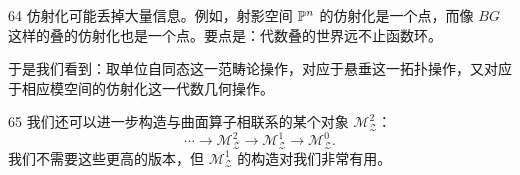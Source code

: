 \begin{srcrem}{64}
仿射化可能丢掉大量信息。例如，射影空间 $\mathbb{P}^{n}$ 的仿射化是一个点，而像 $BG$ 这样的叠的仿射化也是一个点。要点是：代数叠的世界远不止函数环。
\end{srcrem}

于是我们看到：取单位自同态这一范畴论操作，对应于悬垂这一拓扑操作，又对应于相应模空间的仿射化这一代数几何操作。

\begin{srcrem}{65}
我们还可以进一步构造与曲面算子相联系的某个对象 $\mathcal{M}_{\mathcal{Z}}^{2}$：
\begin{equation}\tag{10.195}
\cdots\longrightarrow\mathcal{M}_{\mathcal{Z}}^{2}\longrightarrow\mathcal{M}_{\mathcal{Z}}^{1}\longrightarrow\mathcal{M}_{\mathcal{Z}}^{0}.
\end{equation}
我们不需要这些更高的版本，但 $\mathcal{M}_{\mathcal{Z}}^{1}$ 的构造对我们非常有用。
\end{srcrem}


